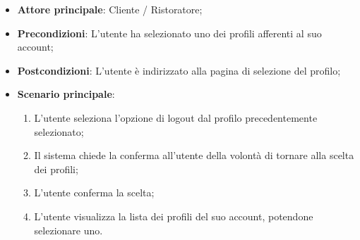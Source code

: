 \begin{itemize}
\item \textbf{Attore principale}: Cliente / Ristoratore;
\item \textbf{Precondizioni}: L'utente ha selezionato uno dei profili afferenti al suo account;
\item \textbf{Postcondizioni}: L'utente è indirizzato alla pagina di selezione del profilo;
\item \textbf{Scenario principale}:
\begin{enumerate}
\item L'utente seleziona l'opzione di logout dal profilo precedentemente selezionato;
\item Il sistema chiede la conferma all'utente della volontà di tornare alla scelta dei profili;
\item L'utente conferma la scelta;
\item L'utente visualizza la lista dei profili del suo account, potendone selezionare uno.
\end{enumerate}
\end{itemize}
